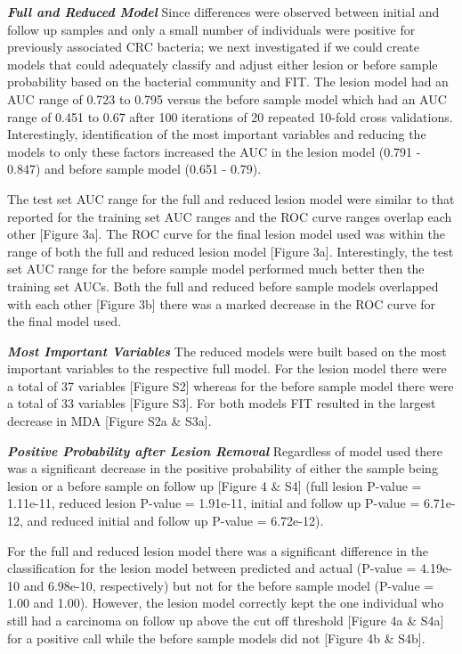 \documentclass[12pt,]{article}
\begin{document}
\textbf{\emph{Full and Reduced Model}} Since differences were observed
between initial and follow up samples and only a small number of
individuals were positive for previously associated CRC bacteria; we
next investigated if we could create models that could adequately
classify and adjust either lesion or before sample probability based on
the bacterial community and FIT. The lesion model had an AUC range of
0.723 to 0.795 versus the before sample model which had an AUC range of
0.451 to 0.67 after 100 iterations of 20 repeated 10-fold cross
validations. Interestingly, identification of the most important
variables and reducing the models to only these factors increased the
AUC in the lesion model (0.791 - 0.847) and before sample model (0.651 -
0.79).

The test set AUC range for the full and reduced lesion model were
similar to that reported for the training set AUC ranges and the ROC
curve ranges overlap each other {[}Figure 3a{]}. The ROC curve for the
final lesion model used was within the range of both the full and
reduced lesion model {[}Figure 3a{]}. Interestingly, the test set AUC
range for the before sample model performed much better then the
training set AUCs. Both the full and reduced before sample models
overlapped with each other {[}Figure 3b{]} there was a marked decrease
in the ROC curve for the final model used.

\textbf{\emph{Most Important Variables}} The reduced models were built
based on the most important variables to the respective full model. For
the lesion model there were a total of 37 variables {[}Figure S2{]}
whereas for the before sample model there were a total of 33 variables
{[}Figure S3{]}. For both models FIT resulted in the largest decrease in
MDA {[}Figure S2a \& S3a{]}.

\textbf{\emph{Positive Probability after Lesion Removal}} Regardless of
model used there was a significant decrease in the positive probability
of either the sample being lesion or a before sample on follow up
{[}Figure 4 \& S4{]} (full lesion P-value = 1.11e-11, reduced lesion
P-value = 1.91e-11, initial and follow up P-value = 6.71e-12, and
reduced initial and follow up P-value = 6.72e-12).

For the full and reduced lesion model there was a significant difference
in the classification for the lesion model between predicted and actual
(P-value = 4.19e-10 and 6.98e-10, respectively) but not for the before
sample model (P-value = 1.00 and 1.00). However, the lesion model
correctly kept the one individual who still had a carcinoma on follow up
above the cut off threshold {[}Figure 4a \& S4a{]} for a positive call
while the before sample models did not {[}Figure 4b \& S4b{]}.
\end{document}
